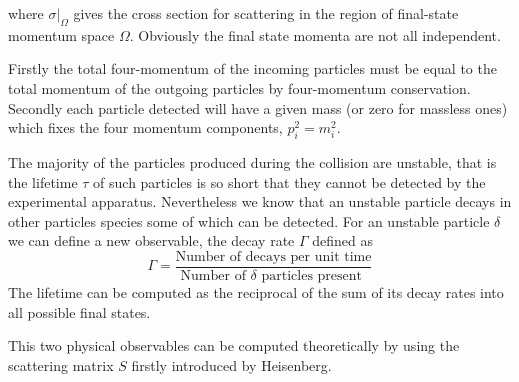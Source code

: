 \documentclass[../main/main.tex]{subfiles}
\begin{document}
where $\sigma|_\Omega$ gives the cross section for scattering in the region of final-state momentum space $\Omega$. Obviously the final state momenta are not all independent.

Firstly the total four-momentum of the incoming particles must be equal to the total momentum of the outgoing particles by four-momentum conservation. Secondly each particle detected will have a given mass (or zero for massless ones) which fixes the four momentum components, $p_i^2 = m_i^2$.

The majority of the particles produced during the collision are unstable, that is the lifetime $\tau$ of 
such particles is so short that they cannot be detected by the experimental apparatus.
Nevertheless we know that an unstable particle decays in other particles species some of which can be detected. 
For an unstable particle $\delta$  we can define a new observable, the decay rate $\Gamma$ defined as 
\begin{equation}
	\Gamma = \frac{\text{Number of decays per unit time}}{\text{Number of  $\delta$  particles present }}
\end{equation}
The lifetime can be computed as the reciprocal of the sum of its decay rates into all possible final states.

This two physical observables can be computed theoretically by using the scattering matrix $S$ firstly introduced by Heisenberg.
\end{document}

